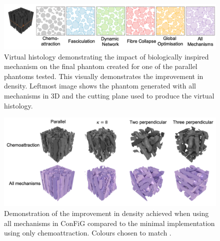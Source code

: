 \begin{figure}
  \centering
  \includegraphics[width=\textwidth]{figures/config/improvements_virthist.png}
  \caption[Impact of biological mechanisms on virtual histology]{Virtual histology demonstrating the impact of biologically inspired mechanism on the final phantom created for one of the parallel phantoms tested. This visually demonstrates the improvement in density. Leftmost image shows the phantom generated with all mechanisms in 3D and the cutting plane used to produce the virtual histology.  }
  \label{fig:config_res_improvements_virthist}
\end{figure}

\begin{figure}
  \centering
  \includegraphics[width=\textwidth]{figures/config/improvement_3drender.png}
  \caption[Impact of biological mechanisms on 3D phantoms]{Demonstration of the improvement in density achieved when using all mechanisms in \ac{ConFiG} compared to the minimal implementation using only chemoattraction. Colours chosen to match . }
  \label{fig:config_res_improvements_3d}
\end{figure}

